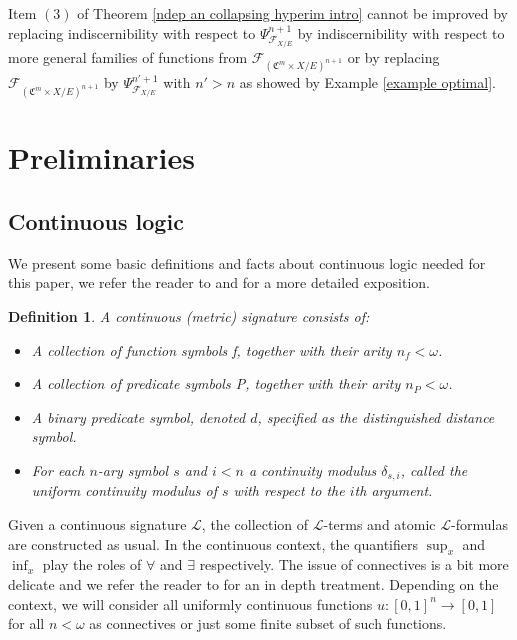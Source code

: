 \documentclass{amsart}
\newtheorem{defin}[teor]{Definition}
\newtheorem{external claim}[teor]{Claim}
\newcommand{\C}{{\mathfrak C}}
\newcommand{\mL}{\mathcal{L}}
\begin{document}
Item $(3)$ of Theorem \ref{ndep an collapsing hyperim intro} cannot be improved by replacing indiscernibility with respect to $\Psi^{n+1}_{\mathcal{F}_{X/E}}$ by indiscernibility with respect to more general families of functions from $\mathcal{F}_{(\C^m \times X/E)^{n+1}}$ or by replacing $\mathcal{F}_{(\C^m \times X/E)^{n+1}}$ by $\Psi^{n'+1}_{\mathcal{F}_{X/E}}$ with $n'>n$ as showed by Example \ref{example optimal}.


\section{Preliminaries}\label{section:prelim}
\subsection{Continuous logic} We present some basic definitions and facts about continuous logic needed for this paper, we refer the reader to \cite{MR2657678} 
and \cite{MR2723787} for a more detailed exposition.

\begin{defin}
    A \emph{continuous (metric) signature} consists of: 
    \begin{itemize}
        \item A collection of function symbols f, together with their arity $n_f<\omega$.
        \item A collection of predicate symbols P, together with their arity $n_P<\omega$.
        \item A binary predicate symbol, denoted $d$, specified as the distinguished \emph{distance symbol}.
        \item For each $n$-ary symbol $s$ and $i<n$ a continuity modulus $\delta_{s,i}$, called the \emph{uniform continuity modulus of } $s$ with respect to the $i$th argument.
    \end{itemize}
\end{defin}

Given a continuous signature $\mL$, the collection of $\mL$-terms and atomic $\mL$-formulas are constructed as usual. In the continuous context, the quantifiers $\sup_x$ and $\inf_x$ play the roles of $\forall$ and $\exists$ respectively. The issue of connectives is a bit more delicate and we refer the reader to \cite{MR2657678} for an in depth treatment. Depending on the context, we will consider all uniformly continuous functions $u:[0,1]^n\to [0,1]$ for all $n<\omega$ as connectives or just some finite subset of such functions.
\end{document}
